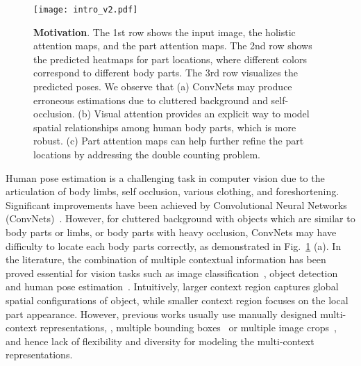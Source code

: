 \documentclass[10pt,twocolumn,letterpaper]{article}
\begin{document}
\begin{figure}
	\begin{center}
	\texttt{[image: intro\_v2.pdf]}
	\end{center}
	\vspace{-1em}
	\caption{\small \textbf{Motivation}. The 1st row shows the input image, the holistic attention maps, and the part attention maps. The 2nd row shows the predicted heatmaps for part locations, where different colors correspond to different body parts. 
	The 3rd row visualizes the predicted poses. 
	We observe that (a) ConvNets may produce erroneous estimations due to cluttered background and self-occlusion. 
	(b) Visual attention provides an explicit way to model spatial relationships among human body parts, which is more robust. 
	(c) Part attention maps can help further refine the part locations by addressing the double counting problem. }
	\label{fig:motivation}
	\vspace{-1.5em}
\end{figure}

Human pose estimation is a challenging task in computer vision due to the articulation of body limbs, self occlusion, various clothing, and foreshortening. 
Significant improvements have been achieved by Convolutional Neural Networks (ConvNets)~\cite{tompson2014joint,toshev2014deeppose,chu2016structure,wei2016convolutional,tompson2015efficient,newell2016stacked}. 
However, for cluttered background with objects which are similar to body parts or limbs, or body parts with heavy occlusion, ConvNets may have difficulty to locate each body parts correctly, as demonstrated in Fig.~\ref{fig:motivation} (a). 
In the literature, the combination of multiple contextual information has been proved essential for vision tasks such as image classification~\cite{krizhevsky2012imagenet}, object  detection~\cite{girshick2014deformable,gidaris2015object,xyzeng2016object} and human pose estimation~\cite{ramakrishna2014pose, tompson2015efficient}. 
Intuitively, larger context region captures global spatial configurations of object, while smaller context region focuses on the local part appearance. 
However, previous works usually use manually designed multi-context representations, \eg, multiple bounding boxes~\cite{ramakrishna2014pose} or multiple image crops~\cite{krizhevsky2012imagenet}, and hence lack of flexibility and diversity for modeling the multi-context representations.
\end{document}

